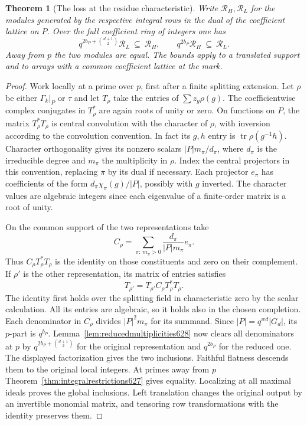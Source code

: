 \documentclass[a4paper,11pt]{article}
\newtheorem{theorem}[proposition]{Theorem}
\theoremstyle{definition}
\theoremstyle{remark}
\numberwithin{equation}{section}
\begin{document}
\begin{theorem}[The loss at the residue characteristic]
\leavevmode\label{thm:residueconductor628}
Write \(\mathcal R_H,\mathcal R_L\) for the modules generated by
the respective integral rows in the dual of the coefficient lattice
on \(P\). Over the full coefficient ring of integers one has
\[
       q^{2b_P+\binom{d+1}2}\mathcal R_L\ \subseteq\ \mathcal R_H,
       \qquad q^{2b_P}\mathcal R_H\ \subseteq\ \mathcal R_L .
\]
Away from \(p\) the two modules are equal. The bounds apply to
a translated support and to arrays with a common coefficient
lattice at the mark.
\end{theorem}
\begin{proof}
Work locally at a prime over \(p\), first after a finite splitting
extension. Let \(\rho\) be either \(\Gamma_k|_P\) or \(\tau\) and
let \(T_\rho\) take the entries of \(\sum z_g\rho(g)\).
The coefficientwise complex conjugates in \(T_\rho^*\) are again
roots of unity or zero. On functions on \(P\), the matrix
\(T_\rho^*T_\rho\) is central convolution with the character of
\(\rho\), with inversion according to the convolution convention.
In fact its \(g,h\) entry is \(\operatorname{tr}\rho(g^{-1}h)\).
Character orthogonality gives its nonzero scalars
\(|P|m_\pi/d_\pi\), where \(d_\pi\) is the irreducible degree and
\(m_\pi\) the multiplicity in \(\rho\). Index the central
projectors in this convention, replacing \(\pi\) by its dual if
necessary. Each projector \(e_\pi\) has coefficients of the form
\(d_\pi\chi_\pi(g)/|P|\), possibly with \(g\) inverted.
The character values are algebraic integers since each eigenvalue
of a finite-order matrix is a root of unity.

On the common support of the two representations take
\[
               C_\rho=\sum_{\pi:\,m_\pi>0}
                        \frac{d_\pi}{|P|m_\pi}e_\pi .
\]
Thus \(C_\rho T_\rho^*T_\rho\) is the identity on those
constituents and zero on their complement. If \(\rho'\) is the
other representation, its matrix of entries satisfies
\[
                T_{\rho'}=T_{\rho'}C_\rho T_\rho^*T_\rho .
\]
The identity first holds over the splitting field in characteristic
zero by the scalar calculation. All its entries are algebraic, so
it holds also in the chosen completion. Each denominator in
\(C_\rho\) divides \(|P|^2m_\pi\) for its summand. Since
\(|P|=q^{wd}|G_d|\), its \(p\)-part is \(q^{b_P}\).
Lemma~\ref{lem:reducedmultiplicities628} now clears all
denominators at \(p\) by \(q^{2b_P+\binom{d+1}2}\) for the original
representation and \(q^{2b_P}\) for the reduced one. The displayed
factorization gives the two inclusions. Faithful flatness descends
them to the original local integers. At primes away from \(p\)
Theorem~\ref{thm:integralrestrictions627} gives equality. Localizing
at all maximal ideals proves the global inclusions. Left translation
changes the original output by an invertible monomial matrix, and
tensoring row transformations with the identity preserves them.
\end{proof}
\end{document}
